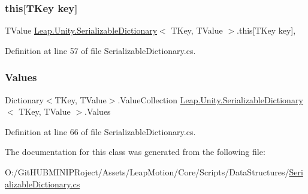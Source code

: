 \subsubsection{\texorpdfstring{this[TKey key]}{this[TKey key]}}
{\footnotesize\ttfamily T\+Value \mbox{\hyperlink{class_leap_1_1_unity_1_1_serializable_dictionary}{Leap.\+Unity.\+Serializable\+Dictionary}}$<$ T\+Key, T\+Value $>$.this\mbox{[}T\+Key key\mbox{]}\hspace{0.3cm}{\ttfamily [get]}, {\ttfamily [set]}}



Definition at line 57 of file Serializable\+Dictionary.\+cs.

\mbox{\label{class_leap_1_1_unity_1_1_serializable_dictionary_a2e69280a4555f8beaa81a567c55401ef}} 
\subsubsection{\texorpdfstring{Values}{Values}}
{\footnotesize\ttfamily Dictionary$<$T\+Key, T\+Value$>$.Value\+Collection \mbox{\hyperlink{class_leap_1_1_unity_1_1_serializable_dictionary}{Leap.\+Unity.\+Serializable\+Dictionary}}$<$ T\+Key, T\+Value $>$.Values\hspace{0.3cm}{\ttfamily [get]}}



Definition at line 66 of file Serializable\+Dictionary.\+cs.



The documentation for this class was generated from the following file\+:\begin{DoxyCompactItemize}
\item 
O\+:/\+Git\+H\+U\+B\+M\+I\+N\+I\+P\+Roject/\+Assets/\+Leap\+Motion/\+Core/\+Scripts/\+Data\+Structures/\mbox{\hyperlink{_serializable_dictionary_8cs}{Serializable\+Dictionary.\+cs}}\end{DoxyCompactItemize}
